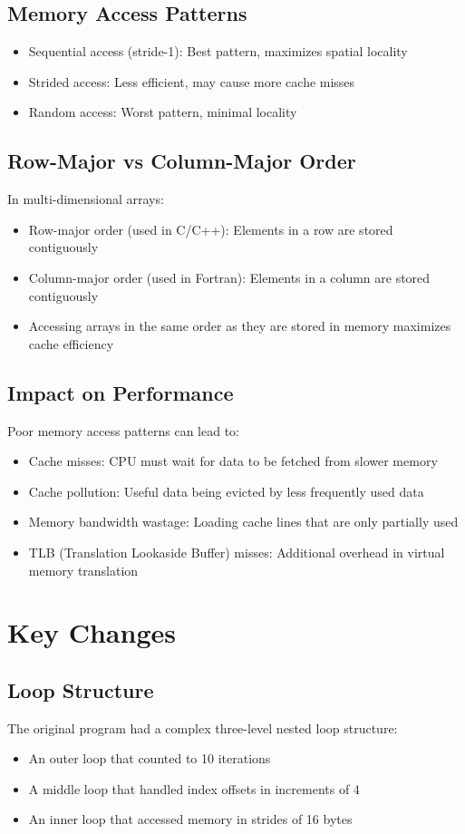 \documentclass{article}
\begin{document}
\subsection{Memory Access Patterns}
\begin{itemize}
    \item Sequential access (stride-1): Best pattern, maximizes spatial locality
    \item Strided access: Less efficient, may cause more cache misses
    \item Random access: Worst pattern, minimal locality
\end{itemize}

\subsection{Row-Major vs Column-Major Order}
In multi-dimensional arrays:
\begin{itemize}
    \item Row-major order (used in C/C++): Elements in a row are stored contiguously
    \item Column-major order (used in Fortran): Elements in a column are stored contiguously
    \item Accessing arrays in the same order as they are stored in memory maximizes cache efficiency
\end{itemize}

\subsection{Impact on Performance}
Poor memory access patterns can lead to:
\begin{itemize}
    \item Cache misses: CPU must wait for data to be fetched from slower memory
    \item Cache pollution: Useful data being evicted by less frequently used data
    \item Memory bandwidth wastage: Loading cache lines that are only partially used
    \item TLB (Translation Lookaside Buffer) misses: Additional overhead in virtual memory translation
\end{itemize}

\section{Key Changes}

\subsection{Loop Structure}
The original program had a complex three-level nested loop structure:
\begin{itemize}
    \item An outer loop that counted to 10 iterations
    \item A middle loop that handled index offsets in increments of 4
    \item An inner loop that accessed memory in strides of 16 bytes
\end{itemize}
\end{document}
